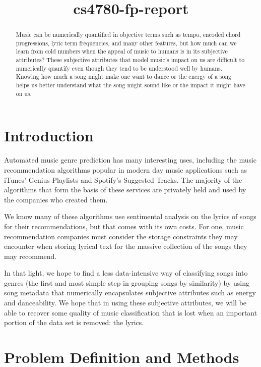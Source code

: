 \documentclass{article}
\title{cs4780-fp-report}
\begin{document}

\begin{abstract}
Music can be numerically quantified in objective terms such as tempo, encoded
chord progressions, lyric term frequencies, and many other features, but how
much can we learn from cold numbers when the appeal of music to humans is in its
subjective attributes? These subjective attributes that model music's impact on
us are difficult to numerically quantify even though they tend to be understood
well by humans. Knowing how much a song might make one want to dance or the
energy of a song helps us better understand what the song might sound like or
the impact it might have on us.
\end{abstract}

\section{Introduction}
Automated music genre prediction has many interesting uses, including the music
recommendation algorithms popular in modern day music applications such as
iTunes' Genius Playlists and Spotify's Suggested Tracks. The majority of the
algorithms that form the basis of these services are privately held and used by
the companies who created them.

We know many of these algorithms use sentimental analysis on the lyrics of songs
for their recommendations, but that comes with its own costs. For one, music
recommendation companies must consider the storage constraints they may encounter
when storing lyrical text for the massive collection of the songs they may recommend.

In that light, we hope to find a less data-intensive way of classifying songs
into genres (the first and most simple step in grouping songs by similarity) by
using song metadata that numerically encapsulates subjective attributes such as
energy and danceability. We hope that in using these subjective attributes, we
will be able to recover some quality of music classification that is lost when
an important portion of the data set is removed: the lyrics.

\section{Problem Definition and Methods}
\end{document}

